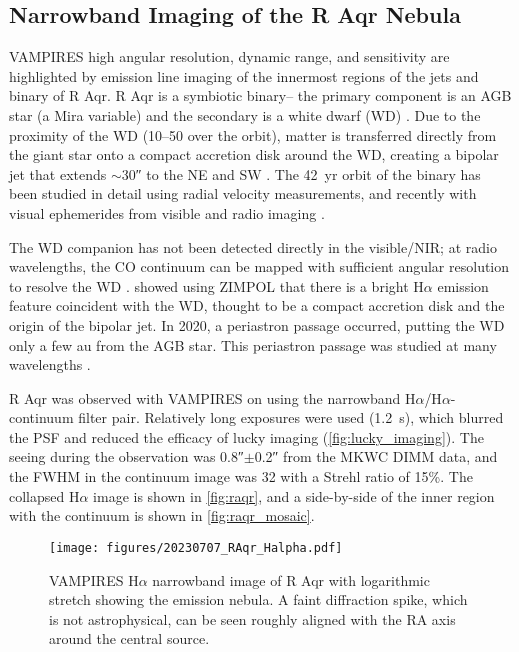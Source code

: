 \subsection{Narrowband Imaging of the R Aqr Nebula\label{sec:raqr}}

VAMPIRES high angular resolution, dynamic range, and sensitivity are highlighted by emission line imaging of the innermost regions of the jets and binary of R Aqr. R Aqr is a symbiotic binary-- the primary component is an AGB star (a Mira variable) and the secondary is a white dwarf (WD) \citep{merrill_partial_1935,merrill_spectra_1940}. Due to the proximity of the WD (\SIrange{10}{50}{\mas} over the orbit), matter is transferred directly from the giant star onto a compact accretion disk around the WD, creating a bipolar jet that extends $\sim$\ang{;;30} to the NE and SW \citep[and references therein]{schmid_spherezimpol_2017}. The \SI{42}{yr} orbit of the binary has been studied in detail using radial velocity measurements, and recently with visual ephemerides from visible and radio imaging \citep{gromadzki_spectroscopic_2009,bujarrabal_high-resolution_2018,alcolea_determining_2023}. 

The WD companion has not been detected directly in the visible/NIR; at radio wavelengths, the CO continuum can be mapped with sufficient angular resolution to resolve the WD \citep{bujarrabal_high-resolution_2018,alcolea_determining_2023}. \citet{schmid_spherezimpol_2017} showed using ZIMPOL that there is a bright H$\alpha$ emission feature coincident with the WD, thought to be a compact accretion disk and the origin of the bipolar jet. In 2020, a periastron passage occurred, putting the WD only a few \si{au} from the AGB star. This periastron passage was studied at many wavelengths \citep{hinkle_2020_2022,sacchi_front-row_2024}.

R Aqr was observed with VAMPIRES on  using the narrowband H$\alpha$/H$\alpha$-continuum filter pair. Relatively long exposures were used (\SI{1.2}{s}), which blurred the PSF and reduced the efficacy of lucky imaging (\autoref{fig:lucky_imaging}). The seeing during the observation was \ang{;;0.8}$\pm$\ang{;;0.2} from the MKWC DIMM data, and the FWHM in the continuum image was \SI{32}{\mas} with a Strehl ratio of 15\%. The collapsed H$\alpha$ image is shown in \autoref{fig:raqr}, and a side-by-side of the inner region with the continuum is shown in \autoref{fig:raqr_mosaic}.


\begin{figure}
    \centering
    \texttt{[image: figures/20230707\_RAqr\_Halpha.pdf]}
    \caption{VAMPIRES H$\alpha$ narrowband image of R Aqr with logarithmic stretch showing the emission nebula. A faint diffraction spike, which is not astrophysical, can be seen roughly aligned with the RA axis around the central source.\label{fig:raqr}}
\end{figure}


